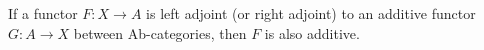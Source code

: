 If a functor $F: X \to A$ is left adjoint (or right adjoint) to an additive functor $G: A \to X$ between Ab-categories, then $F$ is also additive.
